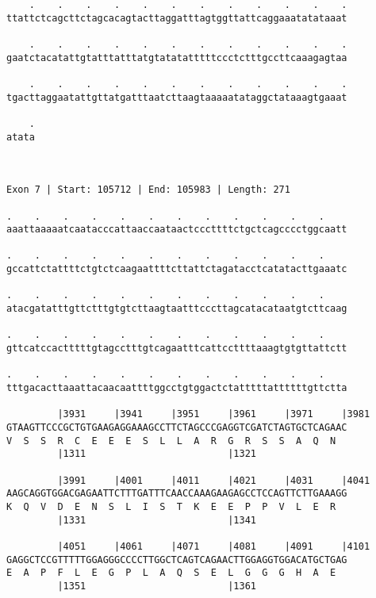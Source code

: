 \documentclass{article}
\begin{document}
\begin{Verbatim}
    .    .    .    .    .    .    .    .    .    .    .    .
ttattctcagcttctagcacagtacttaggatttagtggttattcaggaaatatataaat
                                                            
    .    .    .    .    .    .    .    .    .    .    .    .
gaatctacatattgtatttatttatgtatatatttttccctctttgccttcaaagagtaa
                                                            
    .    .    .    .    .    .    .    .    .    .    .    .
tgacttaggaatattgttatgatttaatcttaagtaaaaatataggctataaagtgaaat
                                                            
    .
atata
     
     
 
Exon 7 | Start: 105712 | End: 105983 | Length: 271
 
.    .    .    .    .    .    .    .    .    .    .    .    
aaattaaaaatcaatacccattaaccaataactcccttttctgctcagcccctggcaatt
                                                            
.    .    .    .    .    .    .    .    .    .    .    .    
gccattctattttctgtctcaagaattttcttattctagatacctcatatacttgaaatc
                                                            
.    .    .    .    .    .    .    .    .    .    .    .    
atacgatatttgttctttgtgtcttaagtaatttcccttagcatacataatgtcttcaag
                                                            
.    .    .    .    .    .    .    .    .    .    .    .    
gttcatccactttttgtagcctttgtcagaatttcattccttttaaagtgtgttattctt
                                                            
.    .    .    .    .    .    .    .    .    .    .    .    
tttgacacttaaattacaacaattttggcctgtggactctatttttattttttgttctta
                                                            
         |3931     |3941     |3951     |3961     |3971     |3981
GTAAGTTCCCGCTGTGAAGAGGAAAGCCTTCTAGCCCGAGGTCGATCTAGTGCTCAGAAC
V  S  S  R  C  E  E  E  S  L  L  A  R  G  R  S  S  A  Q  N  
         |1311                         |1321                
  
         |3991     |4001     |4011     |4021     |4031     |4041
AAGCAGGTGGACGAGAATTCTTTGATTTCAACCAAAGAAGAGCCTCCAGTTCTTGAAAGG
K  Q  V  D  E  N  S  L  I  S  T  K  E  E  P  P  V  L  E  R  
         |1331                         |1341                
  
         |4051     |4061     |4071     |4081     |4091     |4101
GAGGCTCCGTTTTTGGAGGGCCCCTTGGCTCAGTCAGAACTTGGAGGTGGACATGCTGAG
E  A  P  F  L  E  G  P  L  A  Q  S  E  L  G  G  G  H  A  E  
         |1351                         |1361                
  

\end{Verbatim}
\end{document}
